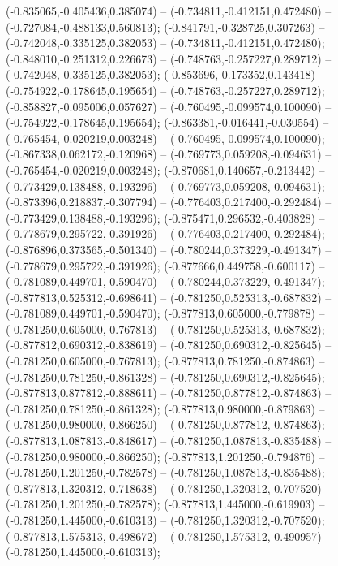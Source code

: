  (-0.835065,-0.405436,0.385074) -- (-0.734811,-0.412151,0.472480) -- (-0.727084,-0.488133,0.560813);
 (-0.841791,-0.328725,0.307263) -- (-0.742048,-0.335125,0.382053) -- (-0.734811,-0.412151,0.472480);
 (-0.848010,-0.251312,0.226673) -- (-0.748763,-0.257227,0.289712) -- (-0.742048,-0.335125,0.382053);
 (-0.853696,-0.173352,0.143418) -- (-0.754922,-0.178645,0.195654) -- (-0.748763,-0.257227,0.289712);
 (-0.858827,-0.095006,0.057627) -- (-0.760495,-0.099574,0.100090) -- (-0.754922,-0.178645,0.195654);
 (-0.863381,-0.016441,-0.030554) -- (-0.765454,-0.020219,0.003248) -- (-0.760495,-0.099574,0.100090);
 (-0.867338,0.062172,-0.120968) -- (-0.769773,0.059208,-0.094631) -- (-0.765454,-0.020219,0.003248);
 (-0.870681,0.140657,-0.213442) -- (-0.773429,0.138488,-0.193296) -- (-0.769773,0.059208,-0.094631);
 (-0.873396,0.218837,-0.307794) -- (-0.776403,0.217400,-0.292484) -- (-0.773429,0.138488,-0.193296);
 (-0.875471,0.296532,-0.403828) -- (-0.778679,0.295722,-0.391926) -- (-0.776403,0.217400,-0.292484);
 (-0.876896,0.373565,-0.501340) -- (-0.780244,0.373229,-0.491347) -- (-0.778679,0.295722,-0.391926);
 (-0.877666,0.449758,-0.600117) -- (-0.781089,0.449701,-0.590470) -- (-0.780244,0.373229,-0.491347);
 (-0.877813,0.525312,-0.698641) -- (-0.781250,0.525313,-0.687832) -- (-0.781089,0.449701,-0.590470);
 (-0.877813,0.605000,-0.779878) -- (-0.781250,0.605000,-0.767813) -- (-0.781250,0.525313,-0.687832);
 (-0.877812,0.690312,-0.838619) -- (-0.781250,0.690312,-0.825645) -- (-0.781250,0.605000,-0.767813);
 (-0.877813,0.781250,-0.874863) -- (-0.781250,0.781250,-0.861328) -- (-0.781250,0.690312,-0.825645);
 (-0.877813,0.877812,-0.888611) -- (-0.781250,0.877812,-0.874863) -- (-0.781250,0.781250,-0.861328);
 (-0.877813,0.980000,-0.879863) -- (-0.781250,0.980000,-0.866250) -- (-0.781250,0.877812,-0.874863);
 (-0.877813,1.087813,-0.848617) -- (-0.781250,1.087813,-0.835488) -- (-0.781250,0.980000,-0.866250);
 (-0.877813,1.201250,-0.794876) -- (-0.781250,1.201250,-0.782578) -- (-0.781250,1.087813,-0.835488);
 (-0.877813,1.320312,-0.718638) -- (-0.781250,1.320312,-0.707520) -- (-0.781250,1.201250,-0.782578);
 (-0.877813,1.445000,-0.619903) -- (-0.781250,1.445000,-0.610313) -- (-0.781250,1.320312,-0.707520);
 (-0.877813,1.575313,-0.498672) -- (-0.781250,1.575312,-0.490957) -- (-0.781250,1.445000,-0.610313);
